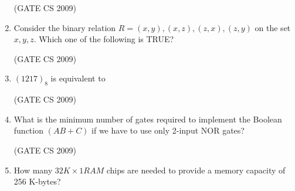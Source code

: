 \documentclass[a4paper, 11pt]{article}
\begin{document}
\begin{enumerate}
    \hfill (GATE CS 2009)

    \item Consider the binary relation $R = {(x, y), (x, z), (z, x), (z, y)}$ on the set ${x, y, z}$. Which one of the following is TRUE?
    \begin{enumerate}
    \end{enumerate}

    \hfill (GATE CS 2009)

    \item $(1217)_8$ is equivalent to
    \begin{enumerate}
    \end{enumerate}

    \hfill (GATE CS 2009)

    \item What is the minimum number of gates required to implement the Boolean function $(AB + C)$ if we have to use only 2-input NOR gates?
    \begin{enumerate}
    \end{enumerate}

    \hfill (GATE CS 2009)

    \item How many $32K \times 1 RAM$ chips are needed to provide a memory capacity of 256 K-bytes?\\
    \begin{enumerate}
    \end{enumerate}


\end{enumerate}
\end{document}
